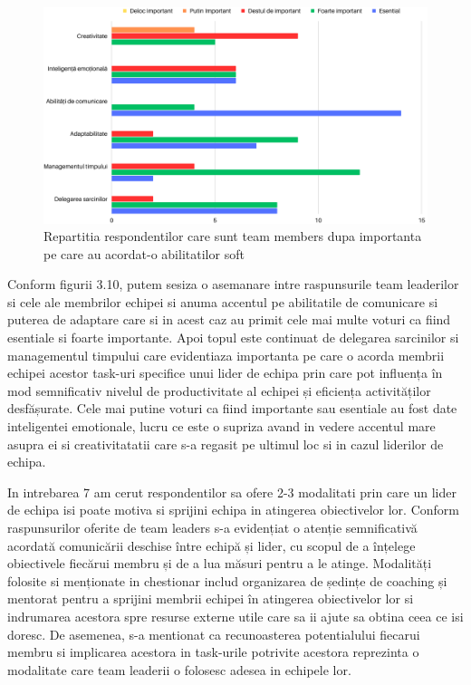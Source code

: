 \documentclass[a4paper, 12pt]{article}
\begin{document}
	\quad \begin{figure}[!htb]
			\centering
			\includegraphics[width=17cm, height=12 cm]{"figures/team members (2).png"}
			\caption {Repartitia respondentilor care sunt team members dupa importanta pe care au acordat-o abilitatilor soft}\label{fig:four}
			
		\end{figure}

	\quad Conform figurii 3.10, putem sesiza o asemanare intre raspunsurile team leaderilor si cele ale membrilor echipei si anuma accentul pe abilitatile de comunicare si puterea de adaptare care si in acest caz au primit cele mai multe voturi ca fiind esentiale si foarte importante. Apoi topul este continuat de delegarea sarcinilor si managementul timpului care evidentiaza importanta pe care o acorda membrii echipei acestor task-uri specifice unui lider de echipa prin care pot influența în mod semnificativ nivelul de productivitate al echipei și eficiența activităților desfășurate. Cele mai putine voturi ca fiind importante sau esentiale au fost date inteligentei emotionale, lucru ce este o supriza avand in vedere accentul mare asupra ei si creativitatatii care s-a regasit  pe ultimul loc si in cazul liderilor de echipa.

\newpage 
	\quad In intrebarea 7 am cerut respondentilor sa ofere 2-3 modalitati prin care un lider de echipa isi poate motiva si sprijini echipa in atingerea obiectivelor lor.  Conform raspunsurilor oferite de team leaders s-a evidențiat o atenție semnificativă acordată comunicării deschise între echipă și lider, cu scopul de a înțelege obiectivele fiecărui membru și de a lua măsuri pentru a le atinge. Modalități folosite si menționate in chestionar includ organizarea de ședințe de coaching și mentorat pentru a sprijini membrii echipei în atingerea obiectivelor lor si indrumarea acestora spre resurse externe utile care sa ii ajute sa obtina ceea ce isi doresc. De asemenea, s-a mentionat ca recunoasterea potentialului fiecarui membru si implicarea acestora in task-urile potrivite acestora reprezinta o modalitate care team leaderii o folosesc adesea in echipele lor.
\end{document}
